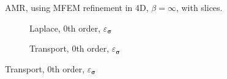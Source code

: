 \documentclass[a4paper,12pt]{amsart}
\numberwithin{equation}{section}
\def\bsigma{{\boldsymbol \sigma}}
\begin{document}
\begin{figure}[h!]
\caption{AMR, using MFEM refinement in 4D, $\beta = \infty$, with slices.}
\label{fig:amr_trans4D_paraview_mars_longrun_part2}
\end{figure}

\begin{figure}[h!]
\centering
\begin{subfigure}[t]{0.49\textwidth}
	\caption{Laplace, 0th order, $\varepsilon_{\bsigma}$}
\end{subfigure}
	\hfill
\begin{subfigure}[t]{0.49\textwidth}
	\caption{Transport, 0th order, $\varepsilon_{\bsigma}$}
\end{subfigure}


\end{figure}
\end{document}
